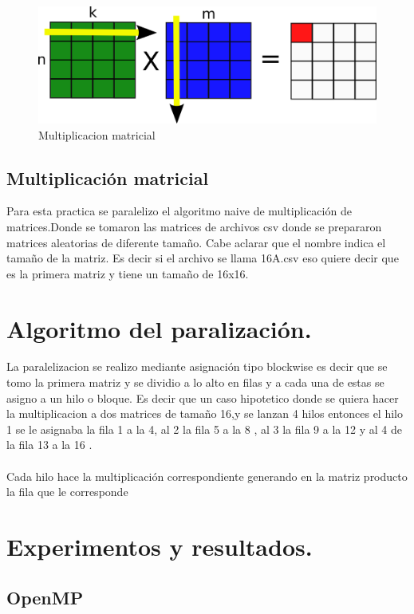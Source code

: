 \documentclass{IEEEtran}
\begin{document}
\begin{figure}[H]
  \includegraphics[width=\linewidth]{matrix.png}
  \caption{Multiplicacion matricial}
  \label{fig:boat1}
\end{figure}
\subsection{Multiplicación matricial}

Para esta practica se paralelizo el algoritmo naive de multiplicación de matrices.Donde se tomaron  las matrices
de archivos csv donde  se  prepararon  matrices aleatorias de diferente tamaño. Cabe aclarar que el nombre
indica el tamaño de la matriz. Es decir si el archivo se llama 16A.csv eso quiere decir que es la primera 
matriz y tiene  un  tamaño de  16x16.  

\section{Algoritmo del paralización.}
La paralelizacion se realizo mediante asignación tipo blockwise es decir que se tomo la primera  matriz y se dividio a lo alto en 
filas y a cada una de estas se asigno a un hilo o  bloque. Es decir que un caso hipotetico donde se quiera hacer la multiplicacion 
a dos matrices  de tamaño 16,y   se  lanzan 4 hilos entonces  el hilo 1 se le asignaba la fila 1 a la 4, al 2 la fila 5 a la 8
, al 3 la fila  9 a la  12  y al 4 de  la fila 13 a la 16 . \\\\
Cada hilo  hace  la  multiplicación correspondiente generando en la matriz  producto la  fila que le corresponde

\section{Experimentos y resultados.}
\subsection{OpenMP}
\end{document}
